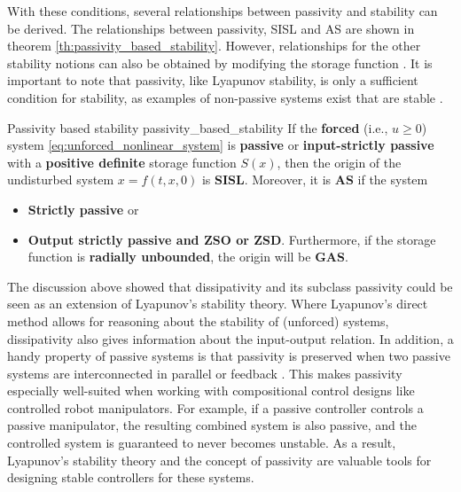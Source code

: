 With these conditions, several relationships between passivity and stability can be derived. The relationships between passivity, SISL and AS are shown in theorem \ref{th:passivity_based_stability}. However, relationships for the other stability notions can also be obtained by modifying the storage function \cite{haddadNonlinearDynamicalSystems2011}. It is important to note that passivity, like Lyapunov stability, is only a sufficient condition for stability, as examples of non-passive systems exist that are stable \cite{ngwompoPassivityAnalysisLinear2017}.
\begin{theorem}[list text=Passivity based stability,after pre=\footnotetext{Lemma 5.5-5.6 of \cite{khalilNonlinearControl2015} were combined and slightly adjusted for clarity.}]{Passivity based stability \cite{khalilNonlinearSystems2002}\footnotemark}{passivity_based_stability}
  If the \textbf{forced} (i.e., $u \ge 0$) system \eqref{eq:unforced_nonlinear_system} is \textbf{passive} or \textbf{input-strictly passive} with a \textbf{positive definite} storage function $S\left(x\right)$, then the origin of the undisturbed system $x=f\left(t, x, 0\right)$ is \textbf{SISL}. Moreover, it is \textbf{AS} if the system
  \begin{itemize}
    \item \textbf{Strictly passive} or
    \item \textbf{Output strictly passive and ZSO or ZSD}.
          Furthermore, if the storage function is \textbf{radially unbounded}, the origin will be \textbf{GAS}.
  \end{itemize}
\end{theorem}

The discussion above showed that dissipativity and its subclass passivity could be seen as an extension of Lyapunov's stability theory. Where Lyapunov's direct method allows for reasoning about the stability of (unforced) systems, dissipativity also gives information about the input-output relation. In addition, a handy property of passive systems is that passivity is preserved when two passive systems are interconnected in parallel or feedback \cite{haddadNonlinearDynamicalSystems2011}. This makes passivity especially well-suited when working with compositional control designs like controlled robot manipulators. For example, if a passive controller controls a passive manipulator, the resulting combined system is also passive, and the controlled system is guaranteed to never becomes unstable. As a result, Lyapunov's stability theory and the concept of passivity are valuable tools for designing stable controllers for these systems.

